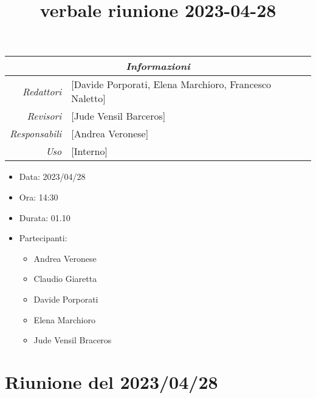 \documentclass[12pt]{article}
\begin{document}
\graphicspath{ {../templates/img} }

\title{verbale riunione 2023-04-28}

\firstPage
\maketitle

\begin{center}
\begin{tabular}{r | l}
    \multicolumn{2}{c}{\textit{Informazioni}}\\
    \hline
    
        \textit{Redattori} &
        [Davide Porporati, Elena Marchioro, Francesco Naletto]\makecell{}\\
    
        \textit{Revisori} &
        [Jude Vensil Barceros]\makecell{}\\
        \textit{Responsabili} &
        [Andrea Veronese]\makecell{}\\
            \textit{Uso} & 
            [Interno]\makecell{}\\
\end{tabular}
    \begin{itemize}
    \item[] Data: 2023/04/28
    \item[] Ora: 14:30
    \item[] Durata: 01.10
    \item[] Partecipanti:
    \begin{itemize}
    \item[] Andrea Veronese
    \item[] Claudio Giaretta
    \item[] Davide Porporati
    \item[] Elena Marchioro
    \item[] Jude Vensil Braceros
    \end{itemize}
    \end{itemize}
\end{center}


\tableofcontents
\printindex 
\section{Riunione del 2023/04/28}
\end{document}
